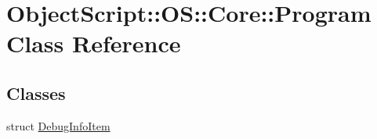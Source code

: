 \hypertarget{class_object_script_1_1_o_s_1_1_core_1_1_program}{}\section{Object\+Script\+:\+:OS\+:\+:Core\+:\+:Program Class Reference}
\label{class_object_script_1_1_o_s_1_1_core_1_1_program}
\subsection*{Classes}
\begin{DoxyCompactItemize}
\item 
struct \hyperlink{struct_object_script_1_1_o_s_1_1_core_1_1_program_1_1_debug_info_item}{Debug\+Info\+Item}
\end{DoxyCompactItemize}
